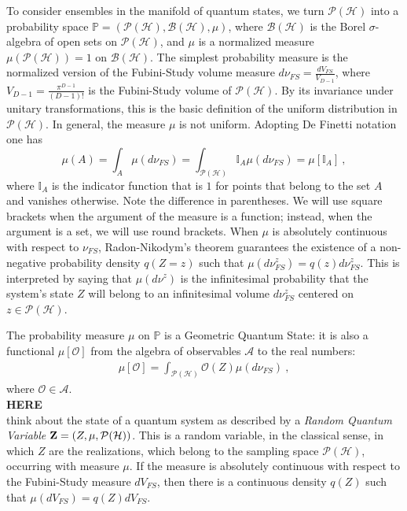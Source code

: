 \documentclass[%
 reprint,
 superscriptaddress,
 aps,
 pra,
]{revtex4-2}
\newcommand{\PH}{\mathcal{P}(\mathcal{H})}
\theoremstyle{definition}
\begin{document}
To consider ensembles in the manifold of quantum states, we turn $\mathcal{P}(\mathcal{H})$ 
into a probability space $\mathbb{P} = (\PH,\mathcal{B}(\mathcal{H}), \mu)$, where $\mathcal{B}(\mathcal{H})$ is the 
Borel $\sigma$-algebra of open sets on $\mathcal{P}(\mathcal{H})$, and $\mu$ is a 
normalized measure $\mu(\PH)=1$ on $\mathcal{B}(\mathcal{H})$. The simplest probability measure 
is the normalized version of the Fubini-Study volume measure $d\nu_{FS}=\frac{dV_{FS}}{V_{D-1}}$, 
where $V_{D-1}=\frac{\pi^{D-1}}{(D-1)!}$ is the Fubini-Study volume of $\PH$. By its 
invariance under unitary transformations, this is the basic definition of the uniform distribution 
in $\PH$. In general, the measure $\mu$ is not uniform. Adopting De Finetti notation one has
\begin{equation}
\mu(A) = \int_A \mu(d\nu_{FS}) = \int_{\PH} \mathbb{I}_A \mu(d\nu_{FS})=\mu[\mathbb{I}_A]~,
\end{equation}
where $\mathbb{I}_A$ is the indicator function that is $1$ for points that belong to the set $A$ and vanishes otherwise. 
Note the difference in parentheses. We will use square brackets when the argument of the measure
is a function; instead, when the argument is a set, we will use round brackets. When $\mu$ is absolutely 
continuous with respect to $\nu_{FS}$, Radon-Nikodym's theorem guarantees the existence of a non-negative 
probability density $q(Z=z)$ such that $\mu(d\nu^z_{FS})=q(z)d\nu^z_{FS}$. This is interpreted by saying that 
$\mu(d\nu^z)$ is the infinitesimal probability that the system's state $Z$ will belong to an infinitesimal volume 
$d\nu^z_{FS}$ centered on $z\in \PH$. 


The probability measure $\mu$ on $\mathbb{P}$ is a Geometric Quantum State: it is
also a functional $\mu[\mathcal{O}]$ from the algebra of observables $\mathcal{A}$ to the 
real numbers: 
\begin{align}
\mu[\mathcal{O}]
  = \int_{\mathcal{P}(\mathcal{H})}  \mathcal{O}(Z) \mu(d\nu_{FS})
  ~,
\label{eq:gqs}
\end{align}
where $\mathcal{O} \in \mathcal{A}$.\\

{\bf HERE}\\

think about the state of a quantum system as described by a \emph{Random Quantum Variable} ${\bf Z} = 
(Z,\mu,\PH)$. This is a random variable, in the classical sense, in which $Z$
are the realizations, which belong to the sampling space $\PH$, occurring 
with measure $\mu$. If the measure is absolutely continuous with respect to the
Fubini-Study measure $dV_{FS}$, then there is a continuous density $q(Z)$
such that $\mu(dV_{FS}) = q(Z)dV_{FS}$. 
\end{document}
